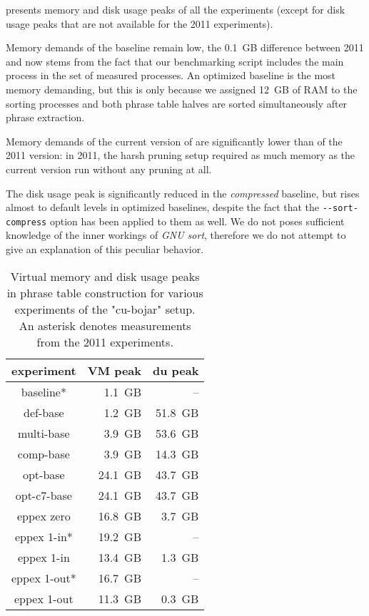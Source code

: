 presents memory and disk usage peaks of all the experiments
(except for disk usage peaks that are not available for the 2011 experiments).

Memory demands of the baseline remain low, the 0.1~GB difference between 2011 and now
stems from the fact that our benchmarking script includes the main process in the set of
measured processes.
An optimized baseline is the most memory demanding, but this is only because we assigned 12~GB
of RAM to the sorting processes and both phrase table halves are sorted simultaneously after
phrase extraction.

Memory demands of the current version of \eppex{} are significantly lower than of the 2011 version:
in 2011, the harsh pruning setup required as much memory as the current version run without
any pruning at all.

The disk usage peak is significantly reduced in the \emph{compressed} baseline, but rises almost to
default levels in optimized baselines, despite the fact that the \verb|--sort-compress| option has been applied
to them as well.
We do not poses sufficient knowledge of the inner workings of \emph{GNU sort}, therefore we do not
attempt to give an explanation of this peculiar behavior.

\begin{table}[ht]
\centering
\begin{tabular}{ | c | r | r | }
\hline
experiment & VM peak & du peak \\
\hline
\hline
baseline*     &  1.1~GB &      -- \\
def-base      &  1.2~GB & 51.8~GB \\
multi-base    &  3.9~GB & 53.6~GB \\
comp-base     &  3.9~GB & 14.3~GB \\
opt-base      & 24.1~GB & 43.7~GB \\
opt-c7-base   & 24.1~GB & 43.7~GB \\
eppex zero    & 16.8~GB &  3.7~GB \\
\hline
eppex 1-in*   & 19.2~GB &      -- \\
eppex 1-in    & 13.4~GB &  1.3~GB \\
\hline
eppex 1-out*  & 16.7~GB &      -- \\
eppex 1-out   & 11.3~GB &  0.3~GB \\
\hline
\end{tabular}
\caption{\label{cu-bojar-vm-and-du-peaks}
Virtual memory and disk usage peaks in phrase table construction for various experiments
of the "cu-bojar" setup. An asterisk denotes measurements from the 2011 experiments.}
\end{table}

